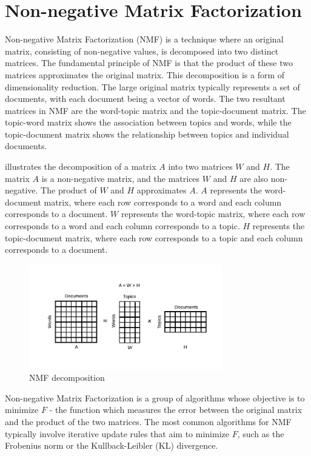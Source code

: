 \section{Non-negative Matrix Factorization}
Non-negative Matrix Factorization (NMF) \cite{shahnaz_document_2006, kasiviswanathan_emerging_2011, yan_learning_2013} is a technique where an original matrix, consisting of non-negative values, is decomposed into two distinct matrices. The fundamental principle of NMF is that the product of these two matrices approximates the original matrix. This decomposition is a form of dimensionality reduction. The large original matrix typically represents a set of documents, with each document being a vector of words. The two resultant matrices in NMF are the word-topic matrix and the topic-document matrix. The topic-word matrix shows the association between topics and words, while the topic-document matrix shows the relationship between topics and individual documents.

 illustrates the decomposition of a matrix \(A\) into two matrices \(W\) and \(H\). The matrix \(A\) is a non-negative matrix, and the matrices \(W\) and \(H\) are also non-negative. The product of \(W\) and \(H\) approximates \(A\). \(A\) represents the word-document matrix, where each row corresponds to a word and each column corresponds to a document. \(W\) represents the word-topic matrix, where each row corresponds to a word and each column corresponds to a topic. \(H\) represents the topic-document matrix, where each row corresponds to a topic and each column corresponds to a document.

\begin{figure}[h] %
    \centering
    \includegraphics[width=0.75\textwidth]{figures/nmf.pdf}
    \caption{NMF decomposition}
    \label{fig:nmf}
\end{figure}

Non-negative Matrix Factorization is a group of algorithms whose objective is to minimize $F$ - the function which measures the error between the original matrix and the product of the two matrices. The most common algorithms for NMF typically involve iterative update rules that aim to minimize $F$, such as the Frobenius norm or the Kullback-Leibler (KL) divergence.

